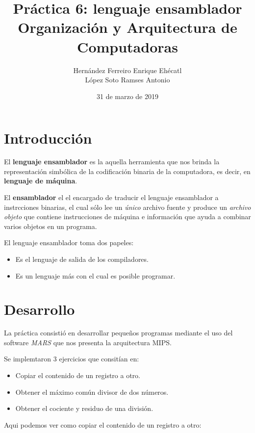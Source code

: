 \documentclass[12pt, letterpaper]{article}
\author{Hernández Ferreiro Enrique Ehécatl \\
          López Soto Ramses Antonio}
\title{Práctica 6: lenguaje ensamblador \\
                {\small Organización y Arquitectura de Computadoras}}
\date{31 de marzo de 2019}
\begin{document}
  \maketitle

  \section{Introducción}
  El \textbf{lenguaje ensamblador} es la aquella herramienta que nos brinda la representación simbólica de la codificación binaria de la computadora, es decir, en \textbf{lenguaje de máquina}.\vspace{.3cm}

  El \textbf{ensamblador} el el encargado de traducir el lenguaje ensamblador a instrcciones binarias, el cual sólo lee un \textit{único} archivo fuente y produce un \textit{archivo objeto} que contiene instrucciones de máquina e información que ayuda a combinar varios objetos en un programa.\vspace{.3cm}

  El lenguaje ensamblador toma dos papeles:
  \begin{itemize}
    \item Es el lenguaje de salida de los compiladores.
    \item Es un lenguaje más con el cual es posible programar.
  \end{itemize}

  \section{Desarrollo}
  La práctica consistió en desarrollar pequeños programas mediante el uso del software \textit{MARS} que nos presenta la arquitectura MIPS.\vspace{.3cm}

  Se implemtaron 3 ejercicios que consitían en:
  \begin{itemize}
    \item Copiar el contenido de un registro a otro.
    \item Obtener el máximo común divisor de dos números.
    \item Obtener el cociente y residuo de una división.
  \end{itemize}

  Aqui podemos ver como copiar el contenido de un registro a otro:\vspace{.2cm}

  \vspace{.3cm}
\end{document}
